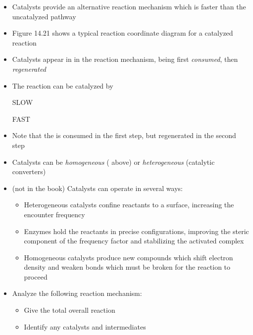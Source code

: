 \documentclass[12pt, openany, letterpaper]{memoir}
\begin{document}
\begin{itemize}
	\item Catalysts provide an alternative reaction mechanism which is faster than the uncatalyzed pathway
	\item Figure 14.21 shows a typical reaction coordinate diagram for a catalyzed reaction
	\item Catalysts appear in in the reaction mechanism, being first \emph{consumed}, then \emph{regenerated}
	\item The reaction  can be catalyzed by 
	
	 \hspace{1em} SLOW
	
	 \hspace{1em} FAST
	\item Note that the  is consumed in the first step, but regenerated in the second step
	\item Catalysts can be \emph{homogeneous} ( above) or \emph{heterogeneous} (catalytic converters)
	\item (not in the book) Catalysts can operate in several ways:
	\begin{itemize}
		\item Heterogeneous catalysts confine reactants to a surface, increasing the encounter frequency
		\item Enzymes hold the reactants in precise configurations, improving the steric component of the frequency factor and stabilizing the activated complex
		\item Homogeneous catalysts produce new compounds which shift electron density and weaken bonds which must be broken for the reaction to proceed
	\end{itemize}
	\item Analyze the following reaction mechanism:
	
	
	
	\begin{itemize}
		\item Give the total overall reaction
		\item Identify any catalysts and intermediates
	\end{itemize}
\end{itemize}
\end{document}
